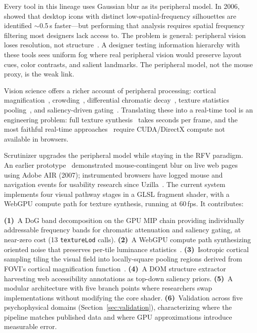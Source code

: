\documentclass[10pt,twocolumn,letterpaper]{article}
\begin{document}
Every tool in this lineage uses Gaussian blur as its peripheral model. In 2006, \citet{queen2006} showed that desktop icons with distinct low-spatial-frequency silhouettes are identified ${\sim}$0.5\,s faster---but performing that analysis requires spatial frequency filtering most designers lack access to. The problem is general: peripheral vision loses resolution, not structure~\citep{rosenholtz2012}. A designer testing information hierarchy with these tools sees uniform fog where real peripheral vision would preserve layout cues, color contrasts, and salient landmarks. The peripheral model, not the mouse proxy, is the weak link.

Vision science offers a richer account of peripheral processing: cortical magnification~\citep{rovamo1979}, crowding~\citep{pelli2008,bouma1970}, differential chromatic decay~\citep{mullen2002}, texture statistics pooling~\citep{freeman2011,rosenholtz2012}, and saliency-driven gating~\citep{mcalonan2008}. Translating these into a real-time tool is an engineering problem: full texture synthesis~\citep{portilla2000} takes seconds per frame, and the most faithful real-time approaches~\citep{walton2021} require CUDA/DirectX compute not available in browsers.

Scrutinizer upgrades the peripheral model while staying in the RFV paradigm. An earlier prototype~\citep{edmonds2007} demonstrated mouse-contingent blur on live web pages using Adobe AIR (2007); instrumented browsers have logged mouse and navigation events for usability research since Uzilla~\citep{edmonds2003}. The current system implements four visual pathway stages in a GLSL fragment shader, with a WebGPU compute path for texture synthesis, running at 60\,fps. It contributes:

\textbf{(1)}~A DoG band decomposition on the GPU MIP chain providing individually addressable frequency bands for chromatic attenuation and saliency gating, at near-zero cost (13 \texttt{textureLod} calls).
\textbf{(2)}~A WebGPU compute path synthesizing oriented noise that preserves per-tile luminance statistics~\citep{freeman2011}.
\textbf{(3)}~Isotropic cortical sampling tiling the visual field into locally-square pooling regions derived from FOVI's cortical magnification function~\citep{blauch2026}.
\textbf{(4)}~A DOM structure extractor harvesting web accessibility annotations as top-down saliency priors.
\textbf{(5)}~A modular architecture with five branch points where researchers swap implementations without modifying the core shader.
\textbf{(6)}~Validation across five psychophysical domains (Section~\ref{sec:validation}), characterizing where the pipeline matches published data and where GPU approximations introduce measurable error.
\end{document}
